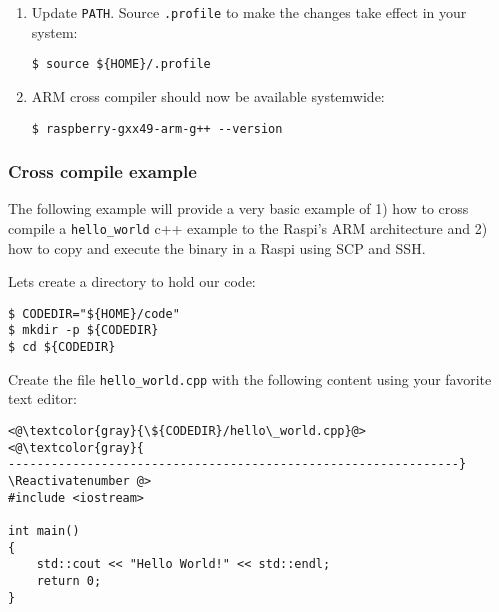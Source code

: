 \begin{enumerate}
\item Update \texttt{PATH}. Source \texttt{.profile} to make the changes
take effect in your system:
\begin{lstlisting}[]
$ source ${HOME}/.profile
\end{lstlisting}
\FloatBarrier
\vspace{-5mm}

\item ARM cross compiler should now be available systemwide:

\begin{lstlisting}[]
$ raspberry-gxx49-arm-g++ --version
\end{lstlisting}
\FloatBarrier
\vspace{-5mm}

%

\end{enumerate}

\subsubsection{Cross compile example}

The following example will provide a very basic example of 1) how to cross compile
a \texttt{hello\_world} c++ example to the \ac{Raspi}'s ARM architecture
and 2) how to copy and execute the binary in a \ac{Raspi} using \ac{SCP} and
\ac{SSH}.

Lets create a directory to hold our code:
\begin{lstlisting}[]
$ CODEDIR="${HOME}/code"
$ mkdir -p ${CODEDIR}
$ cd ${CODEDIR}
\end{lstlisting}
\FloatBarrier
\vspace{-5mm}

Create the file \texttt{hello\_world.cpp} with the following content using your
favorite text editor:

\Suppressnumber\begin{lstlisting}[]
<@\textcolor{gray}{\${CODEDIR}/hello\_world.cpp}@>
<@\textcolor{gray}{
---------------------------------------------------------------}
\Reactivatenumber @>
#include <iostream>

int main()
{
    std::cout << "Hello World!" << std::endl;
    return 0;
}
\end{lstlisting}
\FloatBarrier

